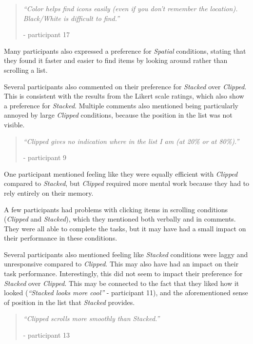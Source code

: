 \documentclass[nobib]{tufte-book} %
\begin{document}
\begin{quote}
  \emph{``Color helps find icons easily (even if you don't remember the location). Black/White is difficult to find.''}

  - participant 17
\end{quote}

Many participants also expressed a preference for \emph{Spatial} conditions, stating that they found it faster and easier to find items by looking around rather than scrolling a list.

Several participants also commented on their preference for \emph{Stacked} over \emph{Clipped}. This is consistent with the results from the Likert scale ratings, which also show a preference for \emph{Stacked}.
Multiple comments also mentioned being particularly annoyed by large \emph{Clipped} conditions, because the position in the list was not visible.

\begin{quote}
  \emph{``Clipped gives no indication where in the list I am (at 20\% or at 80\%).''}

  - participant 9
\end{quote}

One participant mentioned feeling like they were equally efficient with \emph{Clipped} compared to \emph{Stacked}, but \emph{Clipped} required more mental work because they had to rely entirely on their memory.

A few participants had problems with clicking items in scrolling conditions (\emph{Clipped} and \emph{Stacked}), which they mentioned both verbally and in comments. They were all able to complete the tasks, but it may have had a small impact on their performance in these conditions.

Several participants also mentioned feeling like \emph{Stacked} conditions were laggy and unresponsive compared to \emph{Clipped}. This may also have had an impact on their task performance. Interestingly, this did not seem to impact their preference for \emph{Stacked} over \emph{Clipped}. This may be connected to the fact that they liked how it looked (\emph{``Stacked looks more cool''} - participant 11), and the aforementioned sense of position in the list that \emph{Stacked} provides.

\begin{quote}
  \emph{``Clipped scrolls more smoothly than Stacked.''}

  - participant 13
\end{quote}
\end{document}
